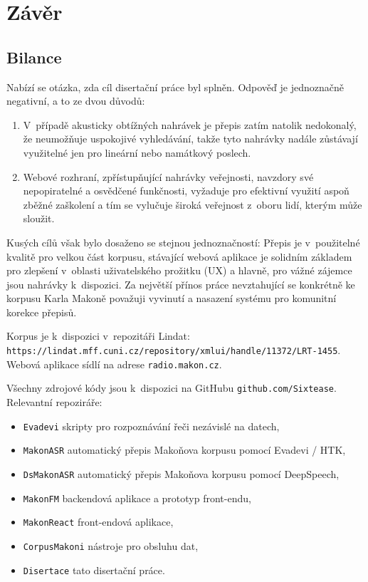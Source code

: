 \chapter{Závěr}
\label{kap:zaver}

\section{Bilance}

Nabízí se otázka, zda cíl disertační práce byl splněn. Odpověď je jednoznačně
negativní, a to ze dvou důvodů:
\begin{enumerate}
\item{V~případě akusticky obtížných nahrávek je přepis
zatím natolik nedokonalý, že neumožňuje uspokojivé vyhledávání, takže tyto
nahrávky nadále zůstávají využitelné jen pro lineární nebo namátkový poslech.}
\item{Webové rozhraní, zpřístupňující nahrávky veřejnosti, navzdory své
nepopiratelné a osvědčené funkčnosti, vyžaduje pro efektivní využití aspoň
zběžné zaškolení a tím se vylučuje široká veřejnost z~oboru lidí, kterým může
sloužit.}
\end{enumerate}

Kusých cílů však bylo dosaženo se stejnou jednoznačností: Přepis je
v~použitelné kvalitě pro velkou část korpusu, stávající webová aplikace je
solidním základem pro zlepšení v~oblasti uživatelského prožitku (UX) a hlavně, pro
vážné zájemce jsou nahrávky k~dispozici.
Za největší přínos práce nevztahující se konkrétně ke korpusu Karla Makoně
považuji vyvinutí a nasazení systému pro komunitní korekce přepisů.

Korpus je k~dispozici v~repozitáři Lindat:\\
\texttt{https://lindat.mff.cuni.cz/repository/xmlui/handle/11372/LRT-1455}.\\
Webová aplikace sídlí na adrese \texttt{radio.makon.cz}.

Všechny zdrojové kódy jsou k~dispozici na GitHubu \texttt{github.com/Sixtease}.
Relevantní repoziráře:
\begin{itemize}
\item{\texttt{Evadevi} skripty pro rozpoznávání řeči nezávislé na datech,}
\item{\texttt{MakonASR} automatický přepis Makoňova korpusu pomocí Evadevi / HTK,}
\item{\texttt{DsMakonASR} automatický přepis Makoňova korpusu pomocí DeepSpeech,}
\item{\texttt{MakonFM} backendová aplikace a prototyp front-endu,}
\item{\texttt{MakonReact} front-endová aplikace,}
\item{\texttt{CorpusMakoni} nástroje pro obsluhu dat,}
\item{\texttt{Disertace} tato disertační práce.}
\end{itemize}

